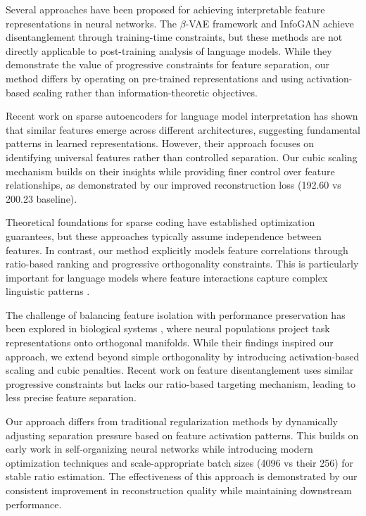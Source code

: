 \documentclass{article} %
\begin{document}
Several approaches have been proposed for achieving interpretable feature representations in neural networks. The $\beta$-VAE framework \cite{Higgins2017betaVAELB} and InfoGAN \cite{Chen2016InfoGANIR} achieve disentanglement through training-time constraints, but these methods are not directly applicable to post-training analysis of language models. While they demonstrate the value of progressive constraints for feature separation, our method differs by operating on pre-trained representations and using activation-based scaling rather than information-theoretic objectives.

Recent work on sparse autoencoders for language model interpretation \cite{Lan2024SparseAR} has shown that similar features emerge across different architectures, suggesting fundamental patterns in learned representations. However, their approach focuses on identifying universal features rather than controlled separation. Our cubic scaling mechanism builds on their insights while providing finer control over feature relationships, as demonstrated by our improved reconstruction loss (192.60 vs 200.23 baseline).

Theoretical foundations for sparse coding \cite{Arora2015SimpleEA} have established optimization guarantees, but these approaches typically assume independence between features. In contrast, our method explicitly models feature correlations through ratio-based ranking and progressive orthogonality constraints. This is particularly important for language models where feature interactions capture complex linguistic patterns \cite{Makelov2024TowardsPE}.

The challenge of balancing feature isolation with performance preservation has been explored in biological systems \cite{Flesch2021RichAL}, where neural populations project task representations onto orthogonal manifolds. While their findings inspired our approach, we extend beyond simple orthogonality by introducing activation-based scaling and cubic penalties. Recent work on feature disentanglement \cite{Zhou2024MitigatingFG} uses similar progressive constraints but lacks our ratio-based targeting mechanism, leading to less precise feature separation.

Our approach differs from traditional regularization methods \cite{Suteu2019RegularizingDM} by dynamically adjusting separation pressure based on feature activation patterns. This builds on early work in self-organizing neural networks \cite{Sirosh1995ASN} while introducing modern optimization techniques and scale-appropriate batch sizes (4096 vs their 256) for stable ratio estimation. The effectiveness of this approach is demonstrated by our consistent improvement in reconstruction quality while maintaining downstream performance.
\end{document}
